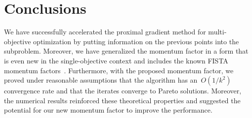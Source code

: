 \documentclass[../main]{subfiles}
\begin{document}
\section{Conclusions}
We have successfully accelerated the proximal gradient method for multi-objective optimization by putting information on the previous points into the subproblem.
Moreover, we have generalized the momentum factor in a form that is even new in the single-objective context and includes the known FISTA momentum factors~\cite{Beck2009,Chambolle2015}.
Furthermore, with the proposed momentum factor, we proved under reasonable assumptions that the algorithm has an~$O(1/k^2)$ convergence rate and that the iterates converge to Pareto solutions.
Moreover, the numerical results reinforced these theoretical properties and suggested the potential for our new momentum factor to improve the performance.
\end{document}

